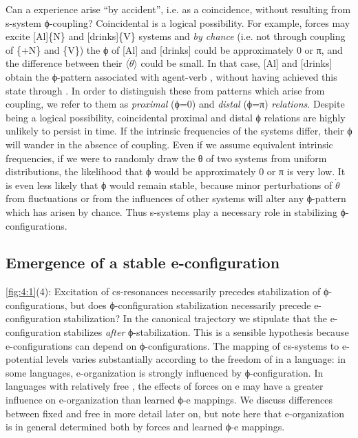   Can a  experience arise “by accident”, i.e. as a coincidence, without resulting from s-system ϕ-coupling? Coincidental  is a logical possibility. For example,  forces may excite [Al]\{N\} and [drinks]\{V\} systems and \textit{by chance} (i.e. not through coupling of \{+N\} and \{V\}) the ϕ of [Al] and [drinks] could be approximately 0 or π, and the difference between their $\langle\dot{\theta}\rangle$ could be small. In that case, [Al] and [drinks] obtain the ϕ-pattern associated with agent-verb , without having achieved this state through . In order to distinguish these from patterns which arise from coupling, we refer to them as \textit{proximal} (ϕ=0) and \textit{distal} (ϕ=π) \textit{relations}. Despite being a logical possibility, coincidental proximal and distal ϕ relations are highly unlikely to persist in time. If the intrinsic frequencies of the systems differ, their ϕ will wander in the absence of coupling. Even if we assume equivalent intrinsic frequencies, if we were to randomly draw the θ of two systems from uniform distributions, the likelihood that ϕ would be approximately 0 or π is very low. It is even less likely that ϕ would remain stable, because minor perturbations of $\dot{\theta}$ from  fluctuations or from the influences of other systems will alter any ϕ-pattern which has arisen by chance. Thus s-systems play a necessary role in stabilizing ϕ-configurations.

\subsection{Emergence of a stable e-configuration}

\ref{fig:4:1}(4): Excitation of cs-resonances necessarily precedes stabilization of ϕ-configurations, but does ϕ-configuration stabilization necessarily precede e-configuration stabilization? In the canonical trajectory we stipulate that the e-configuration stabilizes \textit{after} ϕ-stabilization. This is a sensible hypothesis because e-configurations can depend on ϕ-configurations. The mapping of cs-systems to e-potential levels varies substantially according to the freedom of  in a language: in some languages, e-organization is strongly influenced by ϕ-configuration. In languages with relatively free , the effects of  forces on e may have a greater influence on e-organization than learned ϕ-e mappings. We discuss differences between fixed and  free  in more detail later on, but note here that e-organization is in general determined both by  forces and learned ϕ-e mappings.

